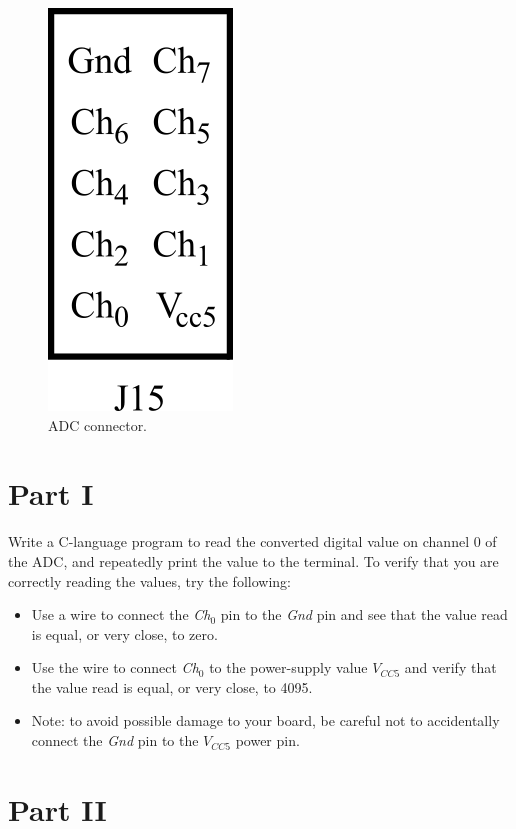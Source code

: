 \documentclass[epsfig,10pt,fullpage]{article}
\begin{document}
\begin{figure}[h!]
   \begin{center}
       \includegraphics{figures/fig_adc_conn.png}
   \end{center}
   \caption{ADC connector.}
	\label{fig:ADC_conn}
\end{figure}

\noindent
\section*{Part I}

\noindent
Write a C-language program to read the converted digital value on channel 0 of the ADC, and 
repeatedly print the value to the terminal. To verify that you are correctly reading the values,
try the following: 
\begin{itemize}
\item Use a wire to connect the {\it Ch}$_{0}$ pin to the \textit{Gnd} pin and see that the 
value read is equal, or very close, to zero.
\item Use the wire to connect {\it Ch}$_{0}$ to the power-supply value $V_{CC5}$ and verify that
the value read is equal, or very close, to 4095.
\item Note: to avoid possible damage to your board, be careful not to accidentally connect the
{\it Gnd} pin to the $V_{CC5}$ power pin.
\end{itemize}

\noindent
\section*{Part II}
\end{document}
